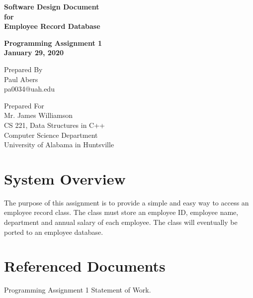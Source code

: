 \documentclass[12pt]{article}%
\begin{document}
\begin{titlepage}
	\clearpage\thispagestyle{empty}
	\centering
	\vspace{2cm}

	{\Huge \textbf{Software Design Document \\
        for \\
        Employee Record Database}} \\
	\vspace{1cm}
	{\large \textbf{Programming Assignment 1 \\
      January 29, 2020} \par}
	\vspace{4cm}
	{\normalsize Prepared By \\ %
      Paul Abers \\
      pa0034@uah.edu \par}
	\vspace{2cm}

    \vspace{2cm}

	{\normalsize Prepared For \\
		Mr. James Williamson \\
		CS 221, Data Structures in C++ \\
        Computer Science Department \\
        University of Alabama in Huntsville \par}

      \vspace{2cm}

	\pagebreak

\end{titlepage}

\tableofcontents

\section{System Overview}
The purpose of this assignment is to provide a simple and easy way
to access an employee record class. The class must store an employee ID,
employee name, department and annual salary of each employee. The class
will eventually be ported to an employee database.

\section{Referenced Documents}
Programming Assignment 1 Statement of Work.
\end{document}
